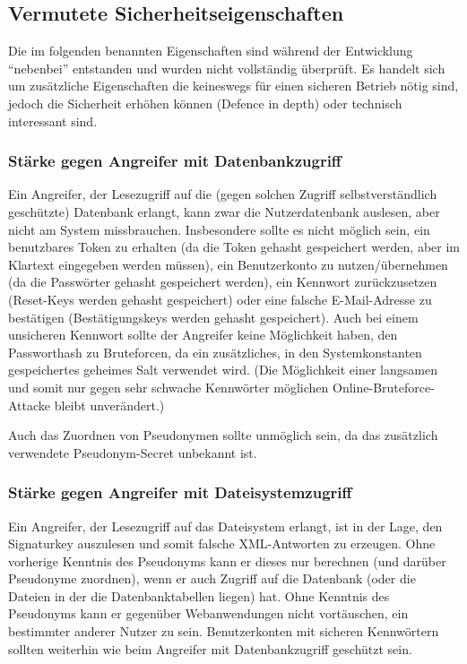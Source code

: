 \documentclass[parskip=half]{scrartcl}
\begin{document}
\subsection{Vermutete Sicherheitseigenschaften}
Die im folgenden benannten Eigenschaften sind während der Entwicklung "`nebenbei"' entstanden und wurden nicht vollständig überprüft.
Es handelt sich um zusätzliche Eigenschaften die keineswegs für einen sicheren Betrieb nötig sind, jedoch die Sicherheit erhöhen können
(Defence in depth) oder technisch interessant sind.

\subsubsection{Stärke gegen Angreifer mit Datenbankzugriff}
Ein Angreifer, der Lesezugriff auf die (gegen solchen Zugriff selbstverständlich geschützte) Datenbank erlangt,
kann zwar die Nutzerdatenbank auslesen, aber nicht am System missbrauchen.
Insbesondere sollte es nicht möglich sein, ein benutzbares Token zu erhalten (da die Token gehasht gespeichert werden, aber im Klartext eingegeben werden müssen),
ein Benutzerkonto zu nutzen/übernehmen (da die Passwörter gehasht gespeichert werden),
ein Kennwort zurückzusetzen (Reset-Keys werden gehasht gespeichert) oder
eine falsche E-Mail-Adresse zu bestätigen (Bestätigungskeys werden gehasht gespeichert).
Auch bei einem unsicheren Kennwort sollte der Angreifer keine Möglichkeit haben, den Passworthash zu Bruteforcen,
da ein zusätzliches, in den Systemkonstanten gespeichertes geheimes Salt verwendet wird.
(Die Möglichkeit einer langsamen und somit nur gegen sehr schwache Kennwörter möglichen Online-Bruteforce-Attacke bleibt unverändert.)

Auch das Zuordnen von Pseudonymen sollte unmöglich sein, da das zusätzlich verwendete Pseudonym-Secret unbekannt ist.

\subsubsection{Stärke gegen Angreifer mit Dateisystemzugriff}
Ein Angreifer, der Lesezugriff auf das Dateisystem erlangt, ist in der Lage, den Signaturkey auszulesen und somit falsche XML-Antworten zu erzeugen.
Ohne vorherige Kenntnis des Pseudonyms kann er dieses nur berechnen (und darüber Pseudonyme zuordnen),
wenn er auch Zugriff auf die Datenbank (oder die Dateien in der die Datenbanktabellen liegen) hat.
Ohne Kenntnis des Pseudonyms kann er gegenüber Webanwendungen nicht vortäuschen, ein bestimmter anderer Nutzer zu sein.
Benutzerkonten mit sicheren Kennwörtern sollten weiterhin wie beim Angreifer mit Datenbankzugriff geschützt sein.
\end{document}
